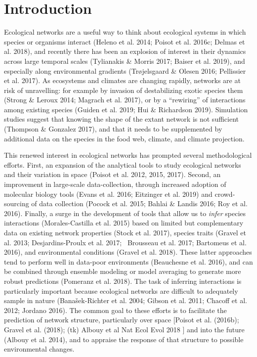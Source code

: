 \hypertarget{introduction}{%
\section{Introduction}\label{introduction}}

Ecological networks are a useful way to think about ecological systems
in which species or organisms interact (Heleno et al. 2014; Poisot et
al. 2016c; Delmas et al. 2018), and recently there has been an explosion
of interest in their dynamics across large temporal scales (Tylianakis
\& Morris 2017; Baiser et al. 2019), and especially along environmental
gradients (Trøjelsgaard \& Olesen 2016; Pellissier et al. 2017). As
ecosystems and climates are changing rapidly, networks are at risk of
unravelling: for example by invasion of destabilizing exotic species
them (Strong \& Leroux 2014; Magrach et al. 2017), or by a ``rewiring''
of interactions among existing species (Guiden et al. 2019; Hui \&
Richardson 2019). Simulation studies suggest that knowing the shape of
the extant network is not sufficient (Thompson \& Gonzalez 2017), and
that it needs to be supplemented by additional data on the species in
the food web, climate, and climate projection.

This renewed interest in ecological networks has prompted several
methodological efforts. First, an expansion of the analytical tools to
study ecological networks and their variation in space (Poisot et al.
2012, 2015, 2017). Second, an improvement in large-scale
data-collection, through increased adoption of molecular biology tools
(Evans et al. 2016; Eitzinger et al. 2019) and crowd-sourcing of data
collection (Pocock et al. 2015; Bahlai \& Landis 2016; Roy et al. 2016).
Finally, a surge in the development of tools that allow us to
\emph{infer} species interactions (Morales-Castilla et al. 2015) based
on limited but complementary data on existing network properties (Stock
et al. 2017), species traits (Gravel et al. 2013; Desjardins-Proulx et
al. 2017; ~Brousseau et al. 2017; Bartomeus et al. 2016), and
environmental conditions (Gravel et al. 2018). These latter approaches
tend to perform well in data-poor environments (Beauchesne et al. 2016),
and can be combined through ensemble modeling or model averaging to
generate more robust predictions (Pomeranz et al. 2018). The task of
inferring interactions is particularly important because ecological
networks are difficult to adequately sample in nature (Banašek-Richter
et al. 2004; Gibson et al. 2011; Chacoff et al. 2012; Jordano 2016). The
common goal to these efforts is to facilitate the prediction of network
structure, particularly over space {[}Poisot et al. (2016b); Gravel et
al. (2018); (tk) Albouy et al Nat Ecol Evol 2018 {]} and into the future
(Albouy et al. 2014), and to appraise the response of that structure to
possible environmental changes.

